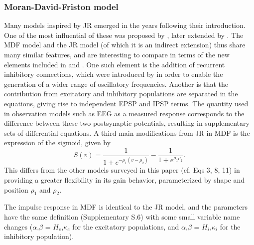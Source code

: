 \documentclass[12pt,twoside]{article}
\begin{document}
\subsubsection{Moran-David-Friston model}
Many models inspired by JR emerged in the years following their introduction. One of the most influential of these was proposed by \citet{david2003neural}, later extended by \citep{moran2007neural}. The MDF model and the JR model (of which it is an indirect extension) thus share many similar features, and are interesting to compare in terms of the new elements included in \citet{david2003neural} and \citep{moran2007neural}. One such element is the addition of recurrent inhibitory connections, which were introduced by \citep{moran2007neural} in order to enable the generation of a wider range of oscillatory frequencies. Another is that the contribution from excitatory and inhibitory populations are separated in the equations, giving rise to independent EPSP and IPSP terms. The quantity used in observation models such as EEG as a measured response corresponds to the difference between these two postsynaptic potentials, resulting in supplementary sets of differential equations. A third main modifications from JR in MDF is the expression of the sigmoid, given by  
\begin{equation}
    S(v)= \frac{1}{1+e^{-\rho_1 (v-\rho_2)}}- \frac{1}{1+e^{\rho_1 \rho_2 }} .
\end{equation}
This differs from the other models surveyed in this paper (cf. Eqs 3, 8, 11) in providing a greater flexibility in its gain behavior, parameterized by  shape and position $\rho_1$ and $\rho_2$. 

The impulse response in MDF is identical to the JR model, and the parameters have the same definition (Supplementary S.6) with some small variable name changes ($\alpha$,$\beta$ = $H_e$,$\kappa_e$ for the excitatory populations, and $\alpha$,$\beta$ = $H_i$,$\kappa_i$ for the inhibitory population).
\end{document}
